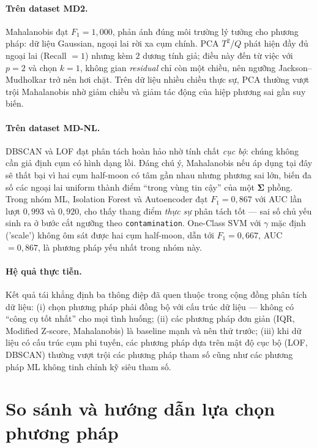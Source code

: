 \documentclass[11pt,a4paper]{article}
\begin{document}
\paragraph{Trên dataset MD2.} Mahalanobis đạt $F_1 = 1{,}000$, phản ánh đúng môi trường lý tưởng cho phương pháp: dữ liệu Gaussian, ngoại lai rời xa cụm chính. PCA $T^2$/$Q$ phát hiện đầy đủ ngoại lai (Recall $= 1$) nhưng kèm $2$ dương tính giả; điều này đến từ việc với $p = 2$ và chọn $k = 1$, không gian \emph{residual} chỉ còn một chiều, nên ngưỡng Jackson--Mudholkar trở nên hơi chặt. Trên dữ liệu nhiều chiều thực sự, PCA thường vượt trội Mahalanobis nhờ giảm chiều và giảm tác động của hiệp phương sai gần suy biến.

\paragraph{Trên dataset MD-NL.} DBSCAN và LOF đạt phân tách hoàn hảo nhờ tính chất \emph{cục bộ}: chúng không cần giả định cụm có hình dạng lồi. Đáng chú ý, Mahalanobis nếu áp dụng tại đây sẽ thất bại vì hai cụm half-moon có tâm gần nhau nhưng phương sai lớn, biến đa số các ngoại lai uniform thành điểm ``trong vùng tin cậy'' của một $\boldsymbol{\Sigma}$ phồng. Trong nhóm ML, Isolation Forest và Autoencoder đạt $F_1 = 0{,}867$ với AUC lần lượt $0{,}993$ và $0{,}920$, cho thấy thang điểm \emph{thực sự} phân tách tốt --- sai số chủ yếu sinh ra ở bước cắt ngưỡng theo \texttt{contamination}. One-Class SVM với $\gamma$ mặc định ('scale') không ôm sát được hai cụm half-moon, dẫn tới $F_1 = 0{,}667$, AUC $= 0{,}867$, là phương pháp yếu nhất trong nhóm này.

\paragraph{Hệ quả thực tiễn.} Kết quả tái khẳng định ba thông điệp đã quen thuộc trong cộng đồng phân tích dữ liệu: (i) chọn phương pháp phải đồng bộ với cấu trúc dữ liệu --- không có ``công cụ tốt nhất'' cho mọi tình huống; (ii) các phương pháp đơn giản (IQR, Modified Z-score, Mahalanobis) là baseline mạnh và nên thử trước; (iii) khi dữ liệu có cấu trúc cụm phi tuyến, các phương pháp dựa trên mật độ cục bộ (LOF, DBSCAN) thường vượt trội các phương pháp tham số cũng như các phương pháp ML không tinh chỉnh kỹ siêu tham số.

\section{So sánh và hướng dẫn lựa chọn phương pháp}
\end{document}
